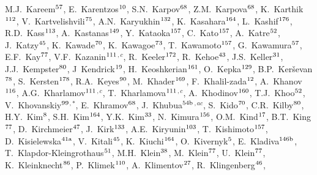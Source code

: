 \begin{flushleft}
M.J.~Kareem$^\textrm{\scriptsize 57}$,
E.~Karentzos$^\textrm{\scriptsize 10}$,
S.N.~Karpov$^\textrm{\scriptsize 68}$,
Z.M.~Karpova$^\textrm{\scriptsize 68}$,
K.~Karthik$^\textrm{\scriptsize 112}$,
V.~Kartvelishvili$^\textrm{\scriptsize 75}$,
A.N.~Karyukhin$^\textrm{\scriptsize 132}$,
K.~Kasahara$^\textrm{\scriptsize 164}$,
L.~Kashif$^\textrm{\scriptsize 176}$,
R.D.~Kass$^\textrm{\scriptsize 113}$,
A.~Kastanas$^\textrm{\scriptsize 149}$,
Y.~Kataoka$^\textrm{\scriptsize 157}$,
C.~Kato$^\textrm{\scriptsize 157}$,
A.~Katre$^\textrm{\scriptsize 52}$,
J.~Katzy$^\textrm{\scriptsize 45}$,
K.~Kawade$^\textrm{\scriptsize 70}$,
K.~Kawagoe$^\textrm{\scriptsize 73}$,
T.~Kawamoto$^\textrm{\scriptsize 157}$,
G.~Kawamura$^\textrm{\scriptsize 57}$,
E.F.~Kay$^\textrm{\scriptsize 77}$,
V.F.~Kazanin$^\textrm{\scriptsize 111}$$^{,c}$,
R.~Keeler$^\textrm{\scriptsize 172}$,
R.~Kehoe$^\textrm{\scriptsize 43}$,
J.S.~Keller$^\textrm{\scriptsize 31}$,
J.J.~Kempster$^\textrm{\scriptsize 80}$,
J~Kendrick$^\textrm{\scriptsize 19}$,
H.~Keoshkerian$^\textrm{\scriptsize 161}$,
O.~Kepka$^\textrm{\scriptsize 129}$,
B.P.~Ker\v{s}evan$^\textrm{\scriptsize 78}$,
S.~Kersten$^\textrm{\scriptsize 178}$,
R.A.~Keyes$^\textrm{\scriptsize 90}$,
M.~Khader$^\textrm{\scriptsize 169}$,
F.~Khalil-zada$^\textrm{\scriptsize 12}$,
A.~Khanov$^\textrm{\scriptsize 116}$,
A.G.~Kharlamov$^\textrm{\scriptsize 111}$$^{,c}$,
T.~Kharlamova$^\textrm{\scriptsize 111}$$^{,c}$,
A.~Khodinov$^\textrm{\scriptsize 160}$,
T.J.~Khoo$^\textrm{\scriptsize 52}$,
V.~Khovanskiy$^\textrm{\scriptsize 99}$$^{,*}$,
E.~Khramov$^\textrm{\scriptsize 68}$,
J.~Khubua$^\textrm{\scriptsize 54b}$$^{,ac}$,
S.~Kido$^\textrm{\scriptsize 70}$,
C.R.~Kilby$^\textrm{\scriptsize 80}$,
H.Y.~Kim$^\textrm{\scriptsize 8}$,
S.H.~Kim$^\textrm{\scriptsize 164}$,
Y.K.~Kim$^\textrm{\scriptsize 33}$,
N.~Kimura$^\textrm{\scriptsize 156}$,
O.M.~Kind$^\textrm{\scriptsize 17}$,
B.T.~King$^\textrm{\scriptsize 77}$,
D.~Kirchmeier$^\textrm{\scriptsize 47}$,
J.~Kirk$^\textrm{\scriptsize 133}$,
A.E.~Kiryunin$^\textrm{\scriptsize 103}$,
T.~Kishimoto$^\textrm{\scriptsize 157}$,
D.~Kisielewska$^\textrm{\scriptsize 41a}$,
V.~Kitali$^\textrm{\scriptsize 45}$,
K.~Kiuchi$^\textrm{\scriptsize 164}$,
O.~Kivernyk$^\textrm{\scriptsize 5}$,
E.~Kladiva$^\textrm{\scriptsize 146b}$,
T.~Klapdor-Kleingrothaus$^\textrm{\scriptsize 51}$,
M.H.~Klein$^\textrm{\scriptsize 38}$,
M.~Klein$^\textrm{\scriptsize 77}$,
U.~Klein$^\textrm{\scriptsize 77}$,
K.~Kleinknecht$^\textrm{\scriptsize 86}$,
P.~Klimek$^\textrm{\scriptsize 110}$,
A.~Klimentov$^\textrm{\scriptsize 27}$,
R.~Klingenberg$^\textrm{\scriptsize 46}$,
$$
\end{flushleft}
